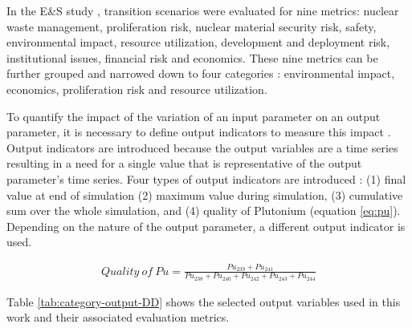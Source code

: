 In the E\&S study 
\cite{wigeland_nuclear_2014}, transition 
scenarios were evaluated for nine metrics: nuclear waste 
management, proliferation risk, nuclear material security risk, 
safety, environmental impact, resource utilization, development 
and deployment risk, institutional issues, financial risk and 
economics. 
These nine metrics can be further grouped and narrowed down to 
four categories \cite{passerini_systematic_2014}: environmental 
impact, economics, proliferation risk and resource utilization. 

To quantify the impact of the variation of an input parameter 
on an output parameter, it is necessary to define output indicators 
to measure this impact \cite{noauthor_effects_2017}. 
Output indicators are introduced because the output variables
are a time series resulting in a need for a single value that 
is representative of the output parameter's time series.  
Four types of output indicators are introduced 
\cite{noauthor_effects_2017}: 
(1) final value at end of simulation
(2) maximum value during simulation,  
(3) cumulative sum over the whole simulation, and 
(4) quality of Plutonium (equation \ref{eq:pu}). 
Depending on the nature of the output parameter, a different 
output indicator is used. 

\begin{align}
    \label{eq:pu}
Quality\ of\ Pu = \frac{Pu_{239}+Pu_{241}}{Pu_{238}+Pu_{240}+Pu_{242}+Pu_{243}+Pu_{244}}
\end{align}

Table \ref{tab:category-output-DD} shows the selected 
output variables used in this work and their associated 
evaluation metrics. 

